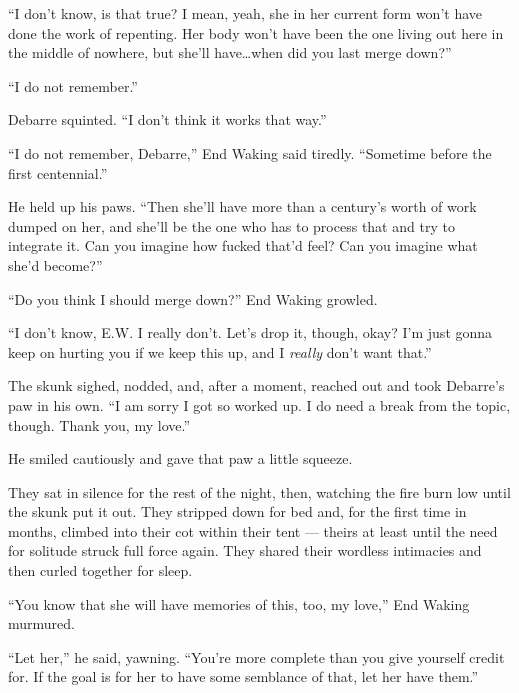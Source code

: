 ``I don't know, is that true? I mean, yeah, she in her current form won't have done the work of repenting. Her body won't have been the one living out here in the middle of nowhere, but she'll have\ldots when did you last merge down?''

``I do not remember.''

Debarre squinted. ``I don't think it works that way.''

``I do not remember, Debarre,'' End Waking said tiredly. ``Sometime before the first centennial.''

He held up his paws. ``Then she'll have more than a century's worth of work dumped on her, and she'll be the one who has to process that and try to integrate it. Can you imagine how fucked that'd feel? Can you imagine what she'd become?''

``Do you think I should merge down?'' End Waking growled.

``I don't know, E.W. I really don't. Let's drop it, though, okay? I'm just gonna keep on hurting you if we keep this up, and I \emph{really} don't want that.''

The skunk sighed, nodded, and, after a moment, reached out and took Debarre's paw in his own. ``I am sorry I got so worked up. I do need a break from the topic, though. Thank you, my love.''

He smiled cautiously and gave that paw a little squeeze.

They sat in silence for the rest of the night, then, watching the fire burn low until the skunk put it out. They stripped down for bed and, for the first time in months, climbed into their cot within their tent — theirs at least until the need for solitude struck full force again. They shared their wordless intimacies and then curled together for sleep.

``You know that she will have memories of this, too, my love,'' End Waking murmured.

``Let her,'' he said, yawning. ``You're more complete than you give yourself credit for. If the goal is for her to have some semblance of that, let her have them.''
